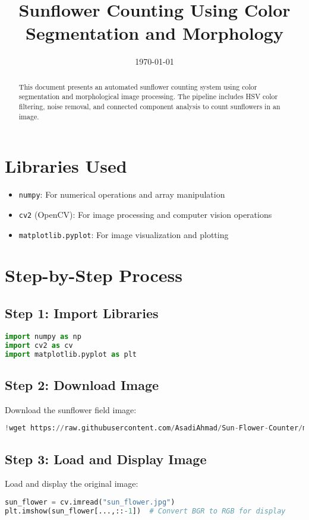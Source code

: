 \documentclass[12pt]{article}
\title{Sunflower Counting Using Color Segmentation and Morphology}
\date{\today}
\begin{document}
\maketitle

\begin{abstract}
This document presents an automated sunflower counting system using color segmentation and morphological image processing. The pipeline includes HSV color filtering, noise removal, and connected component analysis to count sunflowers in an image.
\end{abstract}

\section{Libraries Used}
\begin{itemize}
    \item \texttt{numpy}: For numerical operations and array manipulation
    \item \texttt{cv2} (OpenCV): For image processing and computer vision operations
    \item \texttt{matplotlib.pyplot}: For image visualization and plotting
\end{itemize}

\section{Step-by-Step Process}

\subsection{Step 1: Import Libraries}
\begin{lstlisting}[language=Python]
import numpy as np
import cv2 as cv
import matplotlib.pyplot as plt
\end{lstlisting}

\subsection{Step 2: Download Image}
Download the sunflower field image:
\begin{lstlisting}[language=Python]
!wget https://raw.githubusercontent.com/AsadiAhmad/Sun-Flower-Counter/main/Pictures/sun_flower.jpg -O sun_flower.jpg
\end{lstlisting}

\subsection{Step 3: Load and Display Image}
Load and display the original image:
\begin{lstlisting}[language=Python]
sun_flower = cv.imread("sun_flower.jpg")
plt.imshow(sun_flower[...,::-1])  # Convert BGR to RGB for display
\end{lstlisting}
\end{document}
